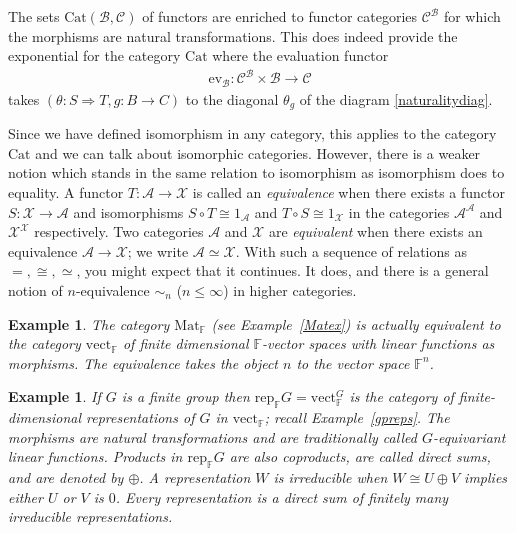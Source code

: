 \documentclass[a4paper,12pt]{article}
\newtheorem{example}[theorem]{Example}
\theoremstyle{step}
\newcommand{\lra}{\longrightarrow}
\newcommand{\Ra}{\Rightarrow}
\def\CA{{\mathscr A}}
\def\CB{{\mathscr B}}
\def\CC{{\mathscr C}}
\def\CX{{\mathscr X}}
\begin{document}
The sets $\mathrm{Cat}(\CB,\CC)$ of functors are enriched to functor categories $\CC^{\CB}$
for which the morphisms are natural transformations. This does indeed provide the exponential
for the category $\mathrm{Cat}$ where the evaluation functor 
\begin{eqnarray*}
\mathrm{ev_{\CB}} : \CC^{\CB}\times \CB \lra \CC
\end{eqnarray*}
 takes $(\theta : S\Ra T, g : B\to C)$ to the diagonal $\theta_g$ of the diagram \eqref{naturalitydiag}. 
 
 Since we have defined isomorphism in any category, this applies to the category 
 $\mathrm{Cat}$ and we can talk about isomorphic categories. 
 However, there is a weaker notion which stands in the same relation to isomorphism as isomorphism
 does to equality. A functor $T : \CA \to \CX$ is called an {\em equivalence} when there exists a 
 functor $S : \CX\to \CA$ and isomorphisms $S\circ T \cong 1_{\CA}$ and $T\circ S\cong 1_{\CX}$
 in the categories $\CA^{\CA}$ and $\CX^{\CX}$ respectively. Two categories $\CA$ and $\CX$ are
 {\em equivalent} when there exists an equivalence $\CA \to \CX$; we write $\CA\simeq \CX$. With such a sequence of relations as $=, \cong, \simeq$, you might expect that it continues. It does,
 and there is a general notion of $n$-equivalence $\sim_n$ ($n\le \infty$) in higher categories. 
 
 \begin{example}\label{Mat=Vect} The category $\mathrm{Mat}_{\mathbb{F}}$ (see Example~\ref{Matex}) is 
 actually equivalent to the category $\mathrm{vect}_{\mathbb{F}}$ of finite dimensional $\mathbb{F}$-vector spaces with linear functions as morphisms. The equivalence takes the object $n$ to the vector space $\mathbb{F}^n$.  
\end{example}
 \begin{example}\label{LinearReps} If $G$ is a finite group then $\mathrm{rep}_{\mathbb{F}}G = \mathrm{vect}_{\mathbb{F}}^G$ is the category of finite-dimensional representations of $G$
 in $\mathrm{vect}_{\mathbb{F}}$; recall Example~\ref{gpreps}. The morphisms are natural
 transformations and are traditionally called {\em $G$-equivariant linear functions}. Products in $\mathrm{rep}_{\mathbb{F}}G$ are also coproducts, are called {\em direct sums}, and are
 denoted by $\oplus$. A representation $W$ is {\em irreducible} when $W \cong U\oplus V$
 implies either $U$ or $V$ is $0$. Every representation is a direct sum of finitely many
 irreducible representations.   
\end{example}
\end{document}
